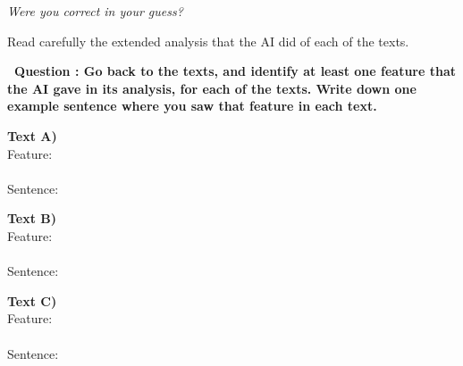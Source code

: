 \documentclass[12pt]{article}
\newcounter{question}
\begin{document}
\textit{Were you correct in your guess?}

Read carefully the extended analysis that the AI did of each of the texts.

  \vspace{0.3cm}
  \textbf{\faEdit\ Question \thequestion: Go back to the texts, and identify at least one feature that the AI gave in its analysis, for each of the texts. Write down one example sentence where you saw that feature in each text.} \\[0.3em]
  
  \begin{Form}

\textbf{Text A)} \\[0.3cm]

Feature: \\[0.2cm]
\TextField[name=A_feature,width=\linewidth,height=1cm, bordercolor={0 0 0}]{} \\[0.4cm]

Sentence: \\[0.2cm]
\TextField[name=A_sentence,width=\linewidth,height=2cm,multiline=true, bordercolor={0 0 0}]{}

\vspace{0.6cm}

\textbf{ Text B)} \\[0.3cm]

Feature: \\[0.2cm]
\TextField[name=B_feature,width=\linewidth,height=1cm, bordercolor={0 0 0}]{} \\[0.4cm]

Sentence: \\[0.2cm]
\TextField[name=B_sentence,width=\linewidth,height=2cm,multiline=true, bordercolor={0 0 0}]{}

\vspace{0.6cm}

\textbf{Text C)} \\[0.3cm]

Feature: \\[0.2cm]
\TextField[name=C_feature,width=\linewidth,height=1cm, bordercolor={0 0 0}]{} \\[0.4cm]

Sentence: \\[0.2cm]
\TextField[name=C_sentence,width=\linewidth,height=2cm,multiline=true, bordercolor={0 0 0}]{}

\end{Form}
\end{document}
